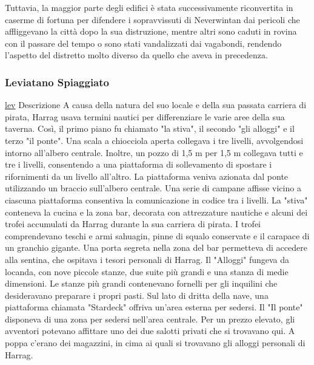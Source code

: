 \documentclass{article}
\begin{document}
Tuttavia, la maggior parte degli edifici è stata successivamente riconvertita in caserme di fortuna per difendere i sopravvissuti di Neverwintan dai pericoli che affliggevano la città dopo la sua distruzione, mentre altri sono caduti in rovina con il passare del tempo o sono stati vandalizzati dai vagabondi, rendendo l'aspetto del distretto molto diverso da quello che aveva in precedenza.
              \subsubsection{Leviatano Spiaggiato}
\hyperlink{leviatano}{lev}
Descrizione\newline
A causa della natura del suo locale e della sua passata carriera di pirata, Harrag usava termini nautici per differenziare le varie aree della sua taverna. Così, il primo piano fu chiamato "la stiva", il secondo "gli alloggi" e il terzo "il ponte". Una scala a chiocciola aperta collegava i tre livelli, avvolgendosi intorno all'albero centrale. Inoltre, un pozzo di 1,5 m per 1,5 m  collegava tutti e tre i livelli, consentendo a una piattaforma di sollevamento di spostare i rifornimenti da un livello all'altro. La piattaforma veniva azionata dal ponte utilizzando un braccio sull'albero centrale. Una serie di campane affisse vicino a ciascuna piattaforma consentiva la comunicazione in codice tra i livelli.\newline
La "stiva" conteneva la cucina e la zona bar, decorata con attrezzature nautiche e alcuni dei trofei accumulati da Harrag durante la sua carriera di pirata. I trofei comprendevano teschi e armi sahuagin, pinne di squalo conservate e il carapace di un granchio gigante. Una porta segreta nella zona del bar permetteva di accedere alla sentina, che ospitava i tesori personali di Harrag.\newline
Il "Alloggi" fungeva da locanda, con nove piccole stanze, due suite più grandi e una stanza di medie dimensioni. Le stanze più grandi contenevano fornelli per gli inquilini che desideravano preparare i propri pasti. Sul lato di dritta della nave, una piattaforma chiamata "Stardeck" offriva un'area esterna per sedersi.\newline
Il "Il ponte" disponeva di una zona per sedersi nell'area centrale. Per un prezzo elevato, gli avventori potevano affittare uno dei due salotti privati che si trovavano qui. A poppa c'erano dei magazzini, in cima ai quali si trovavano gli alloggi personali di Harrag.
\end{document}
